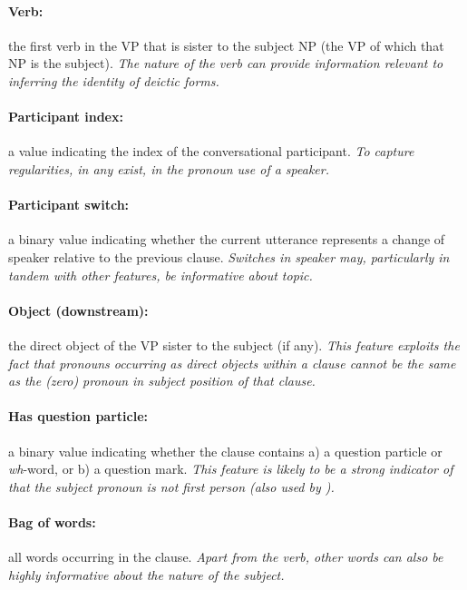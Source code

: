 \documentclass[11pt]{report}
\begin{document}
\paragraph{Verb:} the first verb in the VP that is sister to the subject NP (the VP of which that NP is the subject).   \emph{The nature of the verb can provide information relevant to inferring the identity of  deictic forms.}
\vspace{-0.5em}

\paragraph{Participant index:} a value indicating the index of the conversational participant.   \emph{To capture regularities, in any exist, in the pronoun use of a speaker.}
\vspace{-0.5em}

\paragraph{Participant switch:} a binary value indicating whether the current utterance represents a change of speaker relative to the previous clause.   \emph{Switches in speaker may, particularly in tandem with other features, be informative about topic.}
\vspace{-0.5em}

\paragraph{Object (downstream):} the direct object of the VP sister to the subject (if any).   \emph{This feature exploits the fact that pronouns occurring as direct objects within a clause cannot be the same as the (zero) pronoun in subject position of that clause.}
\vspace{-0.5em}

\paragraph{Has question particle:} a binary value indicating whether the clause contains a) a question particle or \emph{wh}-word, or b) a question mark.   \emph{This feature is likely to be a strong indicator of that the subject pronoun is \emph{not} first person (also used by \cite{chen2013chinese}).}
\vspace{-0.5em}

\paragraph{Bag of words:} all words occurring in the clause.   \emph{Apart from the verb, other words can also be highly informative about the nature of the subject.}
\vspace{-0.5em}
\end{document}
